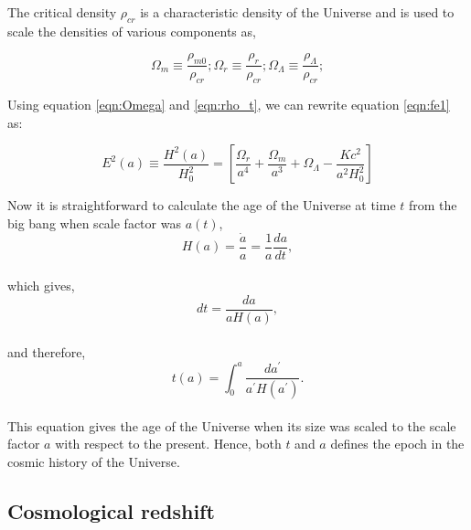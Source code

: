 The critical density $\rho_{cr}$ is a characteristic density of the Universe and is
used to scale the densities of various components as,

\begin{equation}
	\Omega_m \equiv \dfrac{\rho_{m0}}{\rho_{cr}};
	\Omega_r \equiv \dfrac{\rho_{r}}{\rho_{cr}};
	\Omega_{\Lambda} \equiv \dfrac{\rho_{\Lambda}}{\rho_{cr}};
	\label{eqn:Omega}
\end{equation}

Using equation \ref{eqn:Omega} and \ref{eqn:rho_t}, we can rewrite equation \ref{eqn:fe1} 
as:

\begin{equation}
	E^2(a) \equiv \dfrac{H^2(a)}{H_0^2} = \left[\dfrac{\Omega_r}{a^4}
	 + \dfrac{\Omega_m}{a^3} +
	 \Omega_{\Lambda} - \dfrac{Kc^2}{a^2H_0^2}  \right]
\end{equation}

Now it is straightforward to calculate the age of the Universe at time $t$ from the big bang
when scale factor was $a(t)$,
\begin{equation}
	H(a) = \dfrac{\dot{a}}{a} = \dfrac{1}{a} \dfrac{da}{dt},
\end{equation}
\\
which gives,
\begin{equation}
	dt = \dfrac{da}{aH(a)},
\end{equation}
\\
and therefore,
\begin{equation}
	t(a) = \int_0^a \dfrac{da^{\prime}}{a^{\prime}H(a^{\prime})}.
\end{equation}
\\
This equation gives the age of the Universe when its size was
scaled to the scale factor $a$ with respect to the present. Hence, both $t$ and
$a$ defines the epoch in the cosmic history of the Universe.

\subsection{Cosmological redshift}

